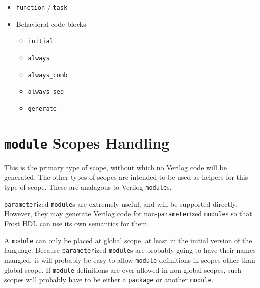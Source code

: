 \documentclass{article}
\begin{document}
\begin{itemize}
		\item \texttt{function} / \texttt{task}

		\item Behavioral code blocks
		\begin{itemize}
			\item \texttt{initial}
			\item \texttt{always}
			\item \texttt{always\_comb}
			\item \texttt{always\_seq}
			\item \texttt{generate}
		\end{itemize}
	\end{itemize}

	\newpage
	\doublespacing

	\section{\texttt{module} Scopes Handling}

	This is the primary type of scope, without which no Verilog code will
	be generated.  The other types of scopes are intended to be used as
	helpers for this type of scope.  These are analagous to Verilog
	\texttt{module}s.

	\texttt{parameter}ized \texttt{module}s are extremely useful, and will
	be supported directly.  However, they may generate Verilog code for
	non-\texttt{parameter}ized \texttt{module}s so that Frost HDL can use
	its own semantics for them.

	A \texttt{module} can only be placed at global scope, at least in the
	initial version of the language.  Because \texttt{parameter}ized
	\texttt{module}s are probably going to have their names mangled, it
	will probably be easy to allow \texttt{module} definitions in scopes
	other than global scope.  If \texttt{module} definitions are ever
	allowed in non-global scopes, such scopes will probably have to be
	either a \texttt{package} or another \texttt{module}.

\end{document}
